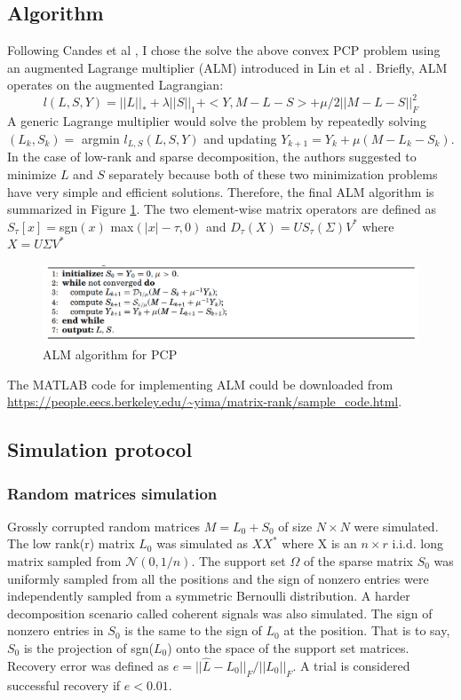 \documentclass[12pt]{extarticle}
\newcommand{\<}{\langle}
\renewcommand{\>}{\rangle}
\theoremstyle{definition}
\begin{document}
\subsection{Algorithm}
Following Candes et al \cite{candes2011robust}, I chose the solve the above convex PCP problem using an augmented Lagrange multiplier (ALM) introduced in Lin et al \cite{lin2010augmented}. Briefly, ALM operates on the augmented Lagrangian: 
\begin{equation}
    l(L,S,Y) = ||L||_* + \lambda ||S||_1 + <Y,M-L-S> + \mu/2||M-L-S||_F^2
\end{equation}
A generic Lagrange multiplier would solve the problem by repeatedly solving $(L_k,S_k) = $ argmin $l_{L,S}(L,S,Y)$ and updating $Y_{k+1}=Y_k+\mu(M-L_k-S_k)$. In the case of low-rank and sparse decomposition, the authors suggested to minimize $L$ and $S$ separately because both of these two minimization problems have very simple and efficient solutions. Therefore, the final ALM algorithm is summarized in Figure \ref{alm}. The two element-wise matrix operators are defined as $S_\tau [x] = $sgn$(x)$ max$(|x|-\tau,0)$ and $D_\tau (X) = U S_\tau(\Sigma) V^*$  where $X = U\Sigma V^*$

\begin{figure}
    \centering
    \includegraphics[width=\textwidth]{Screenshot from 2020-06-07 20-12-05.png}
    \caption{ALM algorithm for PCP}
    \label{alm}
\end{figure}

The MATLAB code for implementing ALM could be downloaded from \url{https://people.eecs.berkeley.edu/~yima/matrix-rank/sample_code.html}. 

\subsection{Simulation protocol}
\subsubsection{Random matrices simulation}
Grossly corrupted random matrices $M=L_0+S_0$ of size $N\times N$ were simulated.  The low rank(r) matrix $L_0$ was simulated as $XX^*$ where X is an $n \times r$ i.i.d. long matrix sampled from $\mathcal{N}(0,1/n)$. The support set $\Omega$ of the sparse matrix $S_0$ was uniformly sampled from all the positions and the sign of nonzero entries were independently sampled from a symmetric Bernoulli distribution. A harder decomposition scenario called coherent signals was also simulated. The sign of nonzero entries in $S_0$ is the same to the sign of $L_0$ at the position. That is to say, $S_0$ is the projection of sgn($L_0$) onto the space of the support set matrices. Recovery error was defined as $e = ||\hat{L}-L_0||_F/||L_0||_F$. A trial is considered successful recovery if $e<0.01$.
\end{document}
